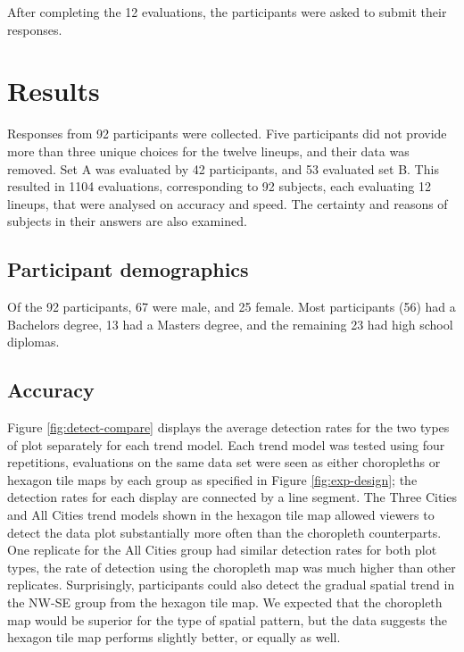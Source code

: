 \documentclass[times, doublespace]{anzsauth}
\begin{document}
After completing the 12 evaluations, the participants were asked to
submit their responses.

\section{Results}\label{results}

Responses from 92 participants were collected. Five participants did not
provide more than three unique choices for the twelve lineups, and their
data was removed. Set A was evaluated by 42 participants, and 53
evaluated set B. This resulted in 1104 evaluations, corresponding to 92
subjects, each evaluating 12 lineups, that were analysed on accuracy and
speed. The certainty and reasons of subjects in their answers are also
examined.

\subsection{Participant demographics}\label{participant-demographics}

Of the 92 participants, 67 were male, and 25 female. Most participants
(56) had a Bachelors degree, 13 had a Masters degree, and the remaining
23 had high school diplomas.

\subsection{Accuracy}\label{accuracy}

Figure \ref{fig:detect-compare} displays the average detection rates for
the two types of plot separately for each trend model. Each trend model
was tested using four repetitions, evaluations on the same data set were
seen as either choropleths or hexagon tile maps by each group as
specified in Figure \ref{fig:exp-design}; the detection rates for each
display are connected by a line segment. The Three Cities and All Cities
trend models shown in the hexagon tile map allowed viewers to detect the
data plot substantially more often than the choropleth counterparts. One
replicate for the All Cities group had similar detection rates for both
plot types, the rate of detection using the choropleth map was much
higher than other replicates. Surprisingly, participants could also
detect the gradual spatial trend in the NW-SE group from the hexagon
tile map. We expected that the choropleth map would be superior for the
type of spatial pattern, but the data suggests the hexagon tile map
performs slightly better, or equally as well.
\end{document}
